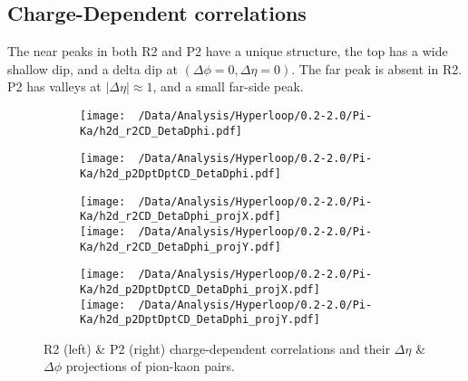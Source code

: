 \documentclass[12pt,a4paper,twoside]{report}
\begin{document}
\subsection{Charge-Dependent correlations}
The near peaks in both R2 and P2 have a unique structure, the top has a wide shallow dip, and a delta dip at $(\Delta\phi=0,\Delta\eta=0)$. The far peak is absent in R2. P2 has valleys at $|\Delta\eta|\approx1$, and a small far-side peak.
\begin{figure}[H]
	\begin{subfigure}{0.49\linewidth}
		\texttt{[image: ~/Data/Analysis/Hyperloop/0.2-2.0/Pi-Ka/h2d\_r2CD\_DetaDphi.pdf]}\\
	\end{subfigure}
	\begin{subfigure}{0.49\linewidth}
		\texttt{[image: ~/Data/Analysis/Hyperloop/0.2-2.0/Pi-Ka/h2d\_p2DptDptCD\_DetaDphi.pdf]}\\
	\end{subfigure}
\end{figure}
\begin{figure}[H]
	\ContinuedFloat
	\begin{subfigure}{0.49\linewidth}
		\texttt{[image: ~/Data/Analysis/Hyperloop/0.2-2.0/Pi-Ka/h2d\_r2CD\_DetaDphi\_projX.pdf]}\\
		\texttt{[image: ~/Data/Analysis/Hyperloop/0.2-2.0/Pi-Ka/h2d\_r2CD\_DetaDphi\_projY.pdf]}\\
	\end{subfigure}
	\begin{subfigure}{0.49\linewidth}
		\texttt{[image: ~/Data/Analysis/Hyperloop/0.2-2.0/Pi-Ka/h2d\_p2DptDptCD\_DetaDphi\_projX.pdf]}\\
		\texttt{[image: ~/Data/Analysis/Hyperloop/0.2-2.0/Pi-Ka/h2d\_p2DptDptCD\_DetaDphi\_projY.pdf]}\\
	\end{subfigure}
	\caption{R2 (left) \& P2 (right) charge-dependent correlations and their $\Delta\eta$ \& $\Delta\phi$ projections of pion-kaon pairs.}
\end{figure}
\end{document}

